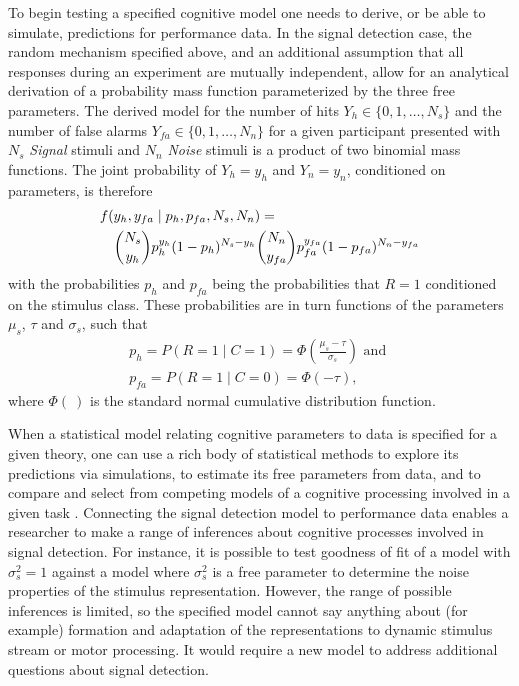 \documentclass[12pt]{article}
\begin{document}
To begin testing a specified cognitive model one needs to derive, or be
able to simulate, predictions for performance data. In the signal detection
case, the random mechanism specified above, and an additional assumption
that all responses during an experiment are mutually independent, allow for
an analytical derivation of a probability mass function parameterized by
the three free parameters.  The derived model for the number of hits
$Y_h \in \{0, 1, \ldots, N_s\}$ and the number of false alarms $Y_{fa} \in
\{0, 1, \ldots, N_n\}$ for a given participant presented with $N_s$
\textit{Signal} stimuli and $N_n$ \textit{Noise} stimuli is a product of two binomial mass
functions. The joint probability of $Y_h=y_h$ and $Y_n=y_n$, conditioned on parameters, is therefore
%
\begin{eqnarray}
\lefteqn{f(y_h, y_{fa} \mid p_h, p_{fa}, N_s, N_n) = }\nonumber \\
& & \binom{N_s}{y_h}p_h^{y_h}(1 - p_{h})^{N_s - y_h}
\binom{N_n}{y_{fa}}p_{fa}^{y_{fa}}(1 - p_{fa})^{N_n - y_{fa}}
\end{eqnarray}
%
with the probabilities $p_h$ and $p_{fa}$ being the probabilities
that $R=1$ conditioned on the stimulus class.  These probabilities are in
turn functions of the parameters $\mu_s$, $\tau$ and $\sigma_s$, such that
%
\begin{align}\nonumber
p_h = P(R = 1 \mid C = 1) = \Phi\left(\frac{\mu_s - \tau}{\sigma_s}\right) \text{ and } \nonumber \\
p_{fa} = P(R = 1 \mid C = 0) = \Phi \left(-\tau\right),
\end{align}
where $\Phi(\:)$ is the standard normal cumulative distribution function.
    
When a statistical model relating cognitive parameters to
data is specified for a given theory, one can use a rich body of
statistical methods to explore its predictions via simulations, to estimate
its free parameters from data, and to compare and select from
competing models of a cognitive processing involved in a given task
\citep{Ber1997,CasBer2002,GelCar2013}. Connecting the signal detection
model to performance data enables a researcher to make a range of
inferences about cognitive processes involved in signal detection. For
instance, it is possible to test goodness of fit of a model with
$\sigma_s^2 = 1$ against a model where $\sigma_s^2$ is a free parameter to
determine the noise properties of the stimulus
representation. However, the range of possible inferences is limited, so
the specified model cannot say anything about (for example) formation and
adaptation of the representations to dynamic stimulus stream or motor processing. It would require a new model to address additional questions about signal
detection.
\end{document}
